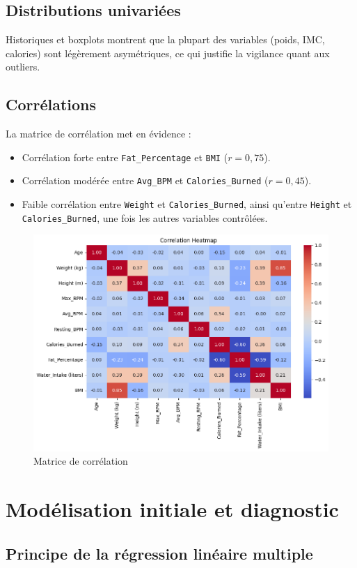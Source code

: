 \documentclass[12pt,a4paper]{article}
\begin{document}
\subsection{Distributions univariées}
Historiques et boxplots montrent que la plupart des variables (poids, IMC, calories) sont légèrement asymétriques, ce qui justifie la vigilance quant aux outliers.

\subsection{Corrélations}
La matrice de corrélation met en évidence :
\begin{itemize}
    \item Corrélation forte entre \texttt{Fat\_Percentage} et \texttt{BMI} ($r = 0{,}75$).
    \item Corrélation modérée entre \texttt{Avg\_BPM} et \texttt{Calories\_Burned} ($r = 0{,}45$).
    \item Faible corrélation entre \texttt{Weight} et \texttt{Calories\_Burned}, ainsi qu’entre \texttt{Height} et \texttt{Calories\_Burned}, une fois les autres variables contrôlées.
\end{itemize}


\begin{figure}[H]
  \centering
  \includegraphics[width=0.7\linewidth]{correlation.png}
  \caption{Matrice de corrélation}
\end{figure}

\section{Modélisation initiale et diagnostic}

\subsection{Principe de la régression linéaire multiple}
\end{document}
